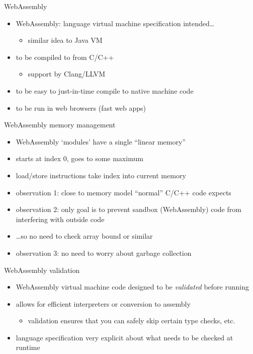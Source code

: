 \begin{frame}{WebAssembly}
    \begin{itemize}
    \item WebAssembly: language virtual machine specification intended\ldots
        \begin{itemize}
        \item similar idea to Java VM
        \end{itemize}
    \vspace{.5cm}
    \item to be compiled to from C/C++
        \begin{itemize}
        \item support by Clang/LLVM
        \end{itemize}
    \item to be easy to just-in-time compile to native machine code
    \item to be run in web browsers (fast web apps)
    \end{itemize}
\end{frame}

\begin{frame}{WebAssembly memory management}
    \begin{itemize}
    \item WebAssembly `modules' have a single ``linear memory''
    \item starts at index 0, goes to some maximum
    \item load/store instructions take index into current memory
    \vspace{.5cm}
    \item observation 1: close to memory model ``normal'' C/C++ code expects
    \vspace{.5cm}
    \item observation 2: only goal is to prevent sandbox (WebAssembly) code from interfering with outside code
    \item \ldots so no need to check array bound or similar
    \vspace{.5cm}
    \item observation 3: no need to worry about garbage collection
    \end{itemize}
\end{frame}

\begin{frame}{WebAssembly validation}
    \begin{itemize}
    \item WebAssembly virtual machine code designed to be \textit{validated} before running
    \vspace{.5cm}
    \item allows for efficient interpreters or conversion to assembly
        \begin{itemize}
        \item validation ensures that you can safely skip certain type checks, etc.
        \end{itemize}
    \item language specification very explicit about what needs to be checked at runtime
    \end{itemize}
\end{frame}

